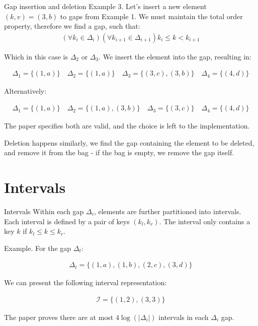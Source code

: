 \documentclass[aspectratio=169,xcolor=dvipsnames]{beamer}
\begin{document}

\begin{frame}{Gap insertion and deletion}
    Example 3. Let's insert a new element $(k,v)=(3,b)$ to gaps from Example 1. We must maintain the total order property,
    therefore we find a gap, such that:
    \begin{align*}
        \left(\forall k_i\in\Delta_i\right)\left( \forall k_{i+1}\in\Delta_{i+1}\right) k_i \leq k < k_{i+1}
    \end{align*}
    
    Which in this case is $\Delta_2$ or $\Delta_3$. We insert the element into the gap, resulting in:

    \begin{align*}
           \Delta_1 = \{(1,a)\} \quad \Delta_2 = \{(1,a)\} \quad \Delta_3 = \{(3,c), (3,b)\} \quad \Delta_4 = \{(4,d)\}
    \end{align*}

    Alternatively:

    \begin{align*}
           \Delta_1 = \{(1,a)\} \quad \Delta_2 = \{(1,a), (3,b)\} \quad \Delta_3 = \{(3,c)\} \quad \Delta_4 = \{(4,d)\}
    \end{align*}

    The paper specifies both are valid, and the choice is left to the implementation.
    
    \vspace{0.1cm}

    Deletion happens similarly, we find the gap containing the element to be deleted, and remove it from the bag - if the bag is empty, we remove the gap itself.
\end{frame}


\section{Intervals}
\begin{frame}{Intervals}
    Within each gap $\Delta_i$, elements are further partitioned into intervals. Each interval is defined by a pair of keys $(k_l, k_r)$. The interval only contains a key $k$ if $k_l \leq k \leq k_r$.

    Example. For the gap $\Delta_t$:

    \begin{align*}
        \Delta_t = \{(1,a), (1,b), (2,c), (3,d)\}
    \end{align*}

    We can present the following interval representation:

    \begin{align*}
        \mathcal{I} = \{(1,2), (3,3)\}
    \end{align*}

    The paper proves there are at most $4\log(|\Delta_i|)$ intervals in each $\Delta_i$ gap.
\end{frame}
\end{document}
